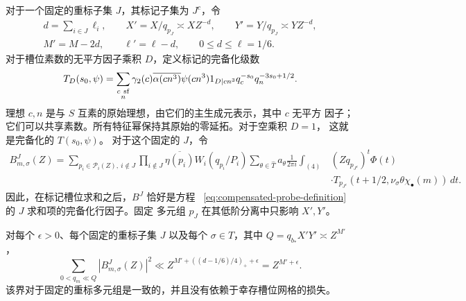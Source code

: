 对于一个固定的重标子集 $J$，其标记子集为 $J^c$，令
\begin{equation}
 \begin{gathered}
 d=\sum_{i\in J}\ell_i,\qquad
 X'=X/q_{p_J}\asymp XZ^{-d},\qquad
 Y'=Y/q_{p_J}\asymp YZ^{-d},\\
 M'=M-2d,\qquad \ell'=\ell-d,\qquad 0\le d\le\ell=1/6.
 \end{gathered}
 \label{old-eq:5.2}
\end{equation}
对于槽位素数的无平方因子乘积 $D$，定义标记的完备化级数
\[
 T_D(s_0,\psi)=\sum_{\substack{c\ {\rm sf}\\n}}
 \gamma_2(c)\overline{\alpha(cn^3)}\psi(cn^3)
 1_{D\mid cn^3}q_c^{-s_0}q_n^{-3s_0+1/2}.
\]
理想 $c,n$ 是与 $S$ 互素的原始理想，由它们的主生成元表示，其中 $c$ 无平方
因子；它们可以共享素数。所有特征幂保持其原始的零延拓。对于空乘积 $D=1$，
这就是完备化的 $T(s_0,\psi)$。
对于这个固定的 $J$，令
\[
\begin{split}
 B^J_{m,\sigma}(Z)=
 \sum_{p_i\in\mathcal P_i(Z),\ i\notin J}
 \prod_{i\notin J}\overline{\eta(p_i)}W_i(q_{p_i}/P_i)
 \sum_{\theta\in\widehat T}a_\theta\frac1{2\pi i}
 \int_{(4)} &(Zq_{p_{J^c}})^t\Phi(t)\\
 &\cdot T_{p_{J^c}}(t+1/2,
             \nu_\sigma\theta\chi_\bullet(m))\,dt.
\end{split}
\]
因此，在标记槽位求和之后，$B^J$ 恰好是方程
~\eqref{eq:compensated-probe-definition} 的 $J$ 求和项的完备化行因子。固定
多元组 $p_J$ 在其低阶分离中只影响 $X',Y'$。

\begin{lemma}[补偿的完备化行范数]\label{lem:probe-row-norm}
对每个 $\epsilon>0$、每个固定的重标子集 $J$ 以及每个 $\sigma\in T$，其中
$Q=q_{b_*}X'Y'\asymp Z^{M'}$，
\begin{equation}
 \sum_{0<q_m\ll Q}|B^J_{m,\sigma}(Z)|^2
       \ll Z^{M'+((d-1/6)/4)_++\epsilon}
       =Z^{M'+\epsilon}.
 \label{old-eq:5.4}
\end{equation}
该界对于固定的重标多元组是一致的，并且没有依赖于幸存槽位网格的损失。
\end{lemma}

